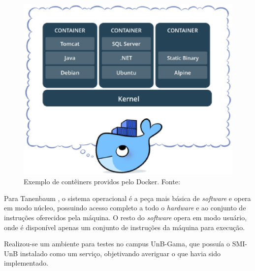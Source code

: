 \begin{figure}[!h]
    \centering
    \includegraphics[keepaspectratio=true,scale=0.8]{figuras/container.eps}
    \caption{Exemplo de contêiners providos pelo Docker. Fonte: \cite{docker} }
    \label{container}
\end{figure}

Para Tanenbaum \cite{tanenbaum_2007}, o sistema operacional é a peça mais básica de \textit{software} e opera em modo núcleo, possuindo acesso completo a todo o \textit{hardware} e ao conjunto de instruções oferecidos pela máquina. O resto do \textit{software} opera em modo usuário, onde é disponível apenas um conjunto de instruções da máquina para execução.

Realizou-se um ambiente para testes no campus UnB-Gama, que possuía o SMI-UnB instalado como um serviço, objetivando averiguar o que havia sido implementado.